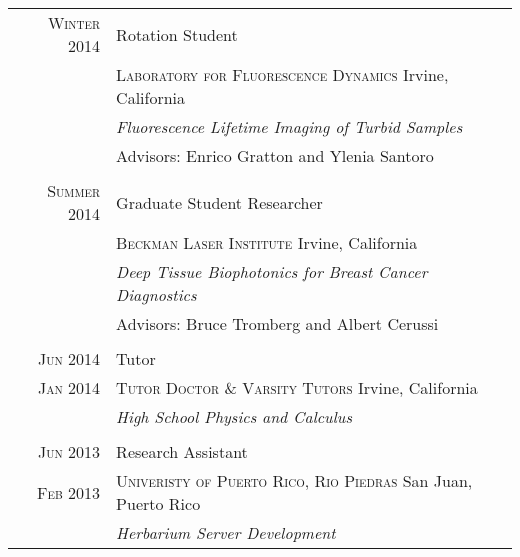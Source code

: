 \documentclass[letterpaper,10pt]{article} %
\begin{document}
\begin{tabular}{r|p{11cm}}

\textsc{Winter 2014} & Rotation Student \\
& \textsc{Laboratory for Fluorescence Dynamics} Irvine, California\\

&\emph{Fluorescence Lifetime Imaging of Turbid Samples}\\
& Advisors: Enrico Gratton and Ylenia Santoro \\

\multicolumn{2}{c}{} \\


\textsc{Summer 2014} & Graduate Student Researcher \\
& \textsc{Beckman Laser Institute} Irvine, California\\

&\emph{Deep Tissue Biophotonics for Breast Cancer Diagnostics}\\ 
& Advisors: Bruce Tromberg and Albert Cerussi \\

\multicolumn{2}{c}{} \\


\textsc{Jun 2014} & Tutor \\
\textsc{Jan 2014} & \textsc{Tutor Doctor \& Varsity Tutors} Irvine, California\\

&\emph{High School Physics and Calculus}\\ 

\multicolumn{2}{c}{} \\


\textsc{Jun 2013} & Research Assistant  \\
\textsc{Feb 2013} & \textsc{Univeristy of Puerto Rico, Rio Piedras} San Juan, Puerto Rico\\

& \emph{Herbarium Server Development}\\ 


\end{tabular}
\end{document}
